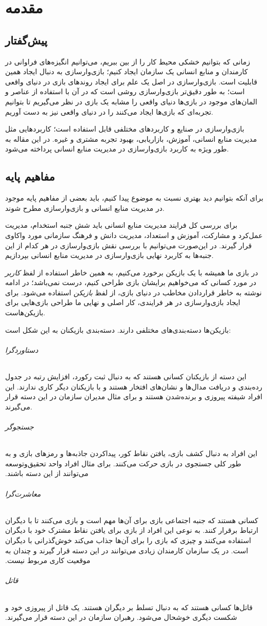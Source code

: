 \chapter{مقدمه}
\section{پیش‌گفتار}
زمانی که بتوانیم خشکی محیط کار را از بین ببریم، می‌توانیم انگیزه‌های فراوانی در کارمندان و منابع انسانی یک سازمان ایجاد کنیم؛ بازی‌وارسازی به دنبال ایجاد همین قابلیت است. بازی‌وارسازی در اصل یک علم برای ایجاد روندهای بازی در دنیای واقعی است؛ به طور دقیق‌تر بازی‌وارسازی روشی است که در آن با استفاده از عناصر و المان‌های موجود در بازی‌ها دنیای واقعی را مشابه یک بازی در نظر می‌گیریم تا بتوانیم تجربه‌ای که بازی‌ها ایجاد می‌کنند را در دنیای واقعی نیز به دست آوریم.

بازی‌وارسازی در صنایع و کاربردهای مختلفی قابل استفاده است؛ کاربردهایی مثل مدیریت منابع انسانی، آموزش، بازاریابی، بهبود تجربه مشتری و غیره. در این مقاله به طور ویژه به کاربرد بازی‌وارسازی در مدیریت منابع انسانی پرداخته می‌شود.
\section{مفاهیم پایه}
برای آنکه بتوانیم دید بهتری نسبت به موضوع پیدا کنیم، باید بعضی از مفاهیم پایه موجود در مدیریت منابع انسانی و بازی‌وارسازی مطرح شوند.

برای بررسی کل فرایند مدیریت منابع انسانی باید شش جنبه استخدام، مدیریت عمل‌کرد و مشارکت، آموزش و استعداد، مدیریت دانش و فرهنگ سازمانی مورد واکاوی قرار گیرند. در این‌صورت می‌توانیم با بررسی نقش بازی‌وارسازی در هر کدام از این جنبه‌ها به کاربرد نهایی بازی‌وارسازی در مدیریت منابع انسانی بپردازیم.

در بازی ما همیشه با یک بازیکن برخورد می‌کنیم، به همین خاطر استفاده از لفظ \emph{کاربر} در مورد کسانی که می‌خواهیم برایشان بازی طراحی کنیم، درست نمی‌باشد؛ در ادامه نوشته به خاطر قراردادن مخاطب در دنیای بازی، از لفظ \emph{بازیکن} استفاده می‌شود. برای ایجاد بازی‌وارسازی در هر فرایندی، کار اصلی و نهایی ما طراحی بازی‌هایی برای بازیکن‌هاست.

بازیکن‌ها دسته‌بندی‌های مختلفی دارند. دسته‌بندی بازیکنان به این شکل است:
\subparagraph{دستاوردگرا}
این دسته از بازیکنان کسانی هستند که به دنبال ثبت رکورد، افزایش رتبه در جدول رده‌بندی و دریافت مدال‌ها و نشان‌های افتخار هستند و با بازیکنان دیگر کاری ندارند. این افراد شیفته پیروزی و برنده‌شدن هستند و برای مثال مدیران سازمان در این دسته قرار می‌گیرند.
\subparagraph{جستجوگر}‫
این افراد به دنبال کشف بازی، یافتن نقاط کور، پیداکردن جاذبه‌ها و رمزهای بازی و به طور کلی جستجوی در بازی حرکت می‌کنند. برای مثال افراد واحد تحقیق‌وتوسعه می‌توانند از این دسته باشند.
\subparagraph{معاشرت‌گرا}‫
کسانی هستند که جنبه اجتماعی بازی برای آن‌ها مهم است و بازی می‌کنند تا با دیگران ارتباط برقرار کنند. به نوعی این افراد از بازی برای یافتن نقاط مشترک خود با دیگران استفاده می‌کنند و چیزی که بازی را برای آن‌ها جذاب می‌کند خوش‌گذرانی با دیگران است. در یک سازمان کارمندان زیادی می‌توانند در این دسته قرار گیرند و چندان به موقعیت کاری مربوط نیست.
\subparagraph{قاتل}‫
قاتل‌ها کسانی هستند که به دنبال تسلط بر دیگران هستند. یک قاتل از پیروزی خود و شکست دیگری خوشحال می‌شود. رهبران سازمان در این دسته قرار می‌گیرند.

